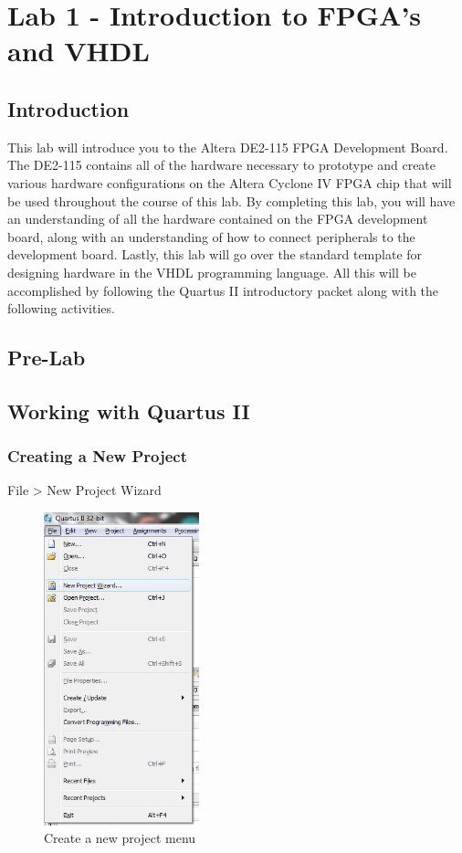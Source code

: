 \section{Lab 1 - Introduction to FPGA's and VHDL}

\subsection{Introduction}
This lab will introduce you to the Altera DE2-115 FPGA Development Board. The DE2-115 contains all of the hardware necessary to prototype and create various hardware configurations on the Altera Cyclone IV FPGA chip that will be used throughout the course of this lab. By completing this lab, you will have an understanding of all the hardware contained on the FPGA development board, along with an understanding of how to connect peripherals to the development board. Lastly, this lab will go over the standard template for designing hardware in the VHDL programming language. All this will be accomplished by following the Quartus II introductory packet along with the following activities.

\subsection{Pre-Lab}

\subsection{Working with Quartus II}

\subsubsection{Creating a New Project}
File > New Project Wizard %

\begin{figure}[H]
	\centering
	\includegraphics[width=45mm]{Lab1/figures/step1.png}
	\caption{Create a new project menu}
	\label{fig:step1}
\end{figure}

